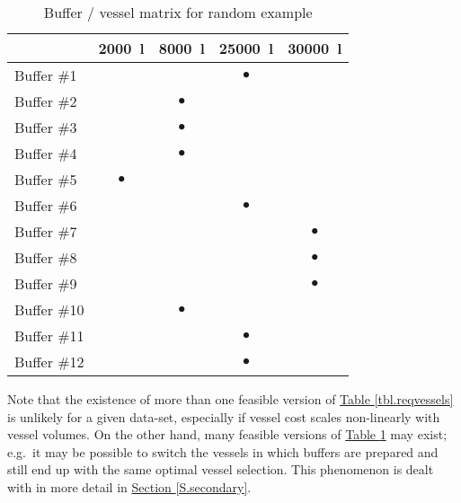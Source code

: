 \begin{table}[t]
    \centering
    \caption{Buffer / vessel matrix for random example}
    \label{tbl.bvmatrix}
    \begin{tabular}{l | c | c | c | c }
        & \SI{2000}{\litre} & \SI{8000}{\litre} & \SI{25000}{\litre} &
        \SI{30000}{\litre}\\ \hline
        Buffer \#1  & & & $\bullet$ & \\
        Buffer \#2  & & $\bullet$ & & \\
        Buffer \#3  & & $\bullet$ & & \\
        Buffer \#4  & & $\bullet$ & & \\
        Buffer \#5  & $\bullet$ & & & \\
        Buffer \#6  & & & $\bullet$ & \\
        Buffer \#7  & & & & $\bullet$ \\
        Buffer \#8  & & & & $\bullet$ \\
        Buffer \#9  & & & & $\bullet$ \\
        Buffer \#10 & & $\bullet$ & & \\
        Buffer \#11 & & & $\bullet$ & \\
        Buffer \#12 & & & $\bullet$ & \\
    \end{tabular}
\end{table}

Note that the existence of more than one feasible version of 
\hyperref[tbl.reqvessels]{Table \ref*{tbl.reqvessels}} is unlikely for a given
data-set, especially if vessel cost scales non-linearly with vessel volumes.
On the other hand, many feasible versions of
\hyperref[tbl.bvmatrix]{Table \ref*{tbl.bvmatrix}} may exist; e.g.\ it may be
possible to switch the vessels in which buffers are prepared and still end up
with the same optimal vessel selection.
This phenomenon is dealt with in more detail in 
\hyperref[S.secondary]{Section \ref*{S.secondary}}.

